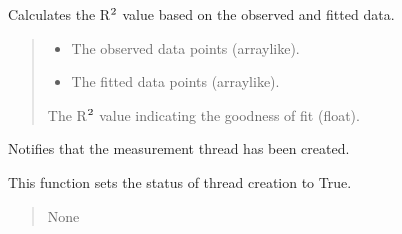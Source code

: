 \documentclass[letterpaper,10pt,english]{sphinxmanual}
\begin{document}
\begin{fulllineitems}

\begin{fulllineitems}
\label{\detokenize{FLIMGraphics:FLIMGraphics.FLIMGraphic.calculateR2}}
\pysigstartsignatures
{}
\pysigstopsignatures
\sphinxAtStartPar
Calculates the R\(\sp{\text{2}}\) value based on the observed and fitted data.
\begin{quote}\begin{description}
\begin{itemize}
\item {} 
\sphinxAtStartPar
{} \textendash{} The observed data points (array\sphinxhyphen{}like).

\item {} 
\sphinxAtStartPar
{} \textendash{} The fitted data points (array\sphinxhyphen{}like).

\end{itemize}

\sphinxAtStartPar
The R\(\sp{\text{2}}\) value indicating the goodness of fit (float).

\end{description}\end{quote}

\end{fulllineitems}


\begin{fulllineitems}
\label{\detokenize{FLIMGraphics:FLIMGraphics.FLIMGraphic.changeCreatedStatus}}
\pysigstartsignatures
{}
\pysigstopsignatures
\sphinxAtStartPar
Notifies that the measurement thread has been created.

\sphinxAtStartPar
This function sets the status of thread creation to True.
\begin{quote}\begin{description}
\sphinxAtStartPar
None


\end{description}
\end{quote}
\end{fulllineitems}
\end{fulllineitems}
\end{document}
